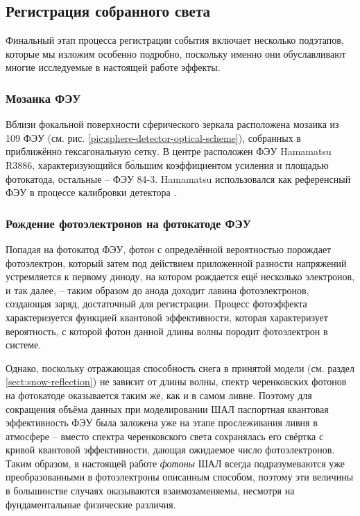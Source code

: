 \subsection{Регистрация собранного света}

Финальный этап процесса регистрации события включает несколько подэтапов, которые мы изложим особенно подробно, поскольку именно они обуславливают многие исследуемые в настоящей работе эффекты.

\subsubsection{Мозаика ФЭУ}
\label{sec:pmt-mosaic-details}

Вблизи фокальной поверхности сферического зеркала расположена мозаика из 109 ФЭУ (см. рис. \ref{pic:sphere-detector-optical-scheme}), собранных в приближённо гексагональную сетку. В центре расположен ФЭУ Hamamatsu R3886, характеризующийся б\`{о}льшим коэффициентом усиления и площадью фотокатода, остальные -- ФЭУ 84-3. Hamamatsu использовался как референсный ФЭУ в процессе калибровки детектора \cite{SphereCalibration2016}.

\subsubsection{Рождение фотоэлектронов на фотокатоде ФЭУ}

\label{sec:photon-to-phels-conversion}

Попадая на фотокатод ФЭУ, фотон с определённой вероятностью порождает фотоэлектрон, который затем под действием приложенной разности напряжений устремляется к первому диноду, на котором рождается ещё несколько электронов, и так далее, -- таким образом до анода доходит лавина фотоэлектронов, создающая заряд, достаточный для регистрации. Процесс фотоэффекта характеризуется функцией квантовой эффективности, которая характеризует вероятность, с которой фотон данной длины волны породит фотоэлектрон в системе.

Однако, поскольку отражающая способность снега в принятой модели (см. раздел \ref{sect:snow-reflection}) не зависит от длины волны, спектр черенковских фотонов на фотокатоде оказывается таким же, как и в самом ливне. Поэтому для сокращения объёма данных при моделировании ШАЛ паспортная квантовая эффективность ФЭУ была заложена уже на этапе прослеживания ливня в атмосфере -- вместо спектра черенковского света сохранялась его свёртка с кривой квантовой эффективности, дающая ожидаемое число фотоэлектронов. Таким образом, в настоящей работе \textit{фотоны} ШАЛ всегда подразумеваются уже преобразованными в фотоэлектроны описанным способом, поэтому эти величины в большинстве случаях оказываются взаимозаменяемы, несмотря на фундаментальные физические различия.

